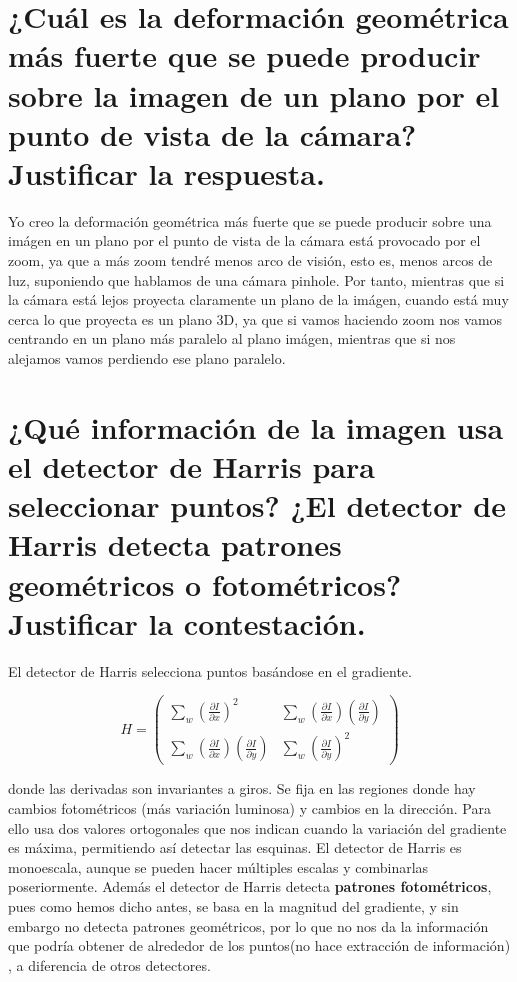 \section{¿Cuál es la deformación geométrica más fuerte que se puede producir sobre
la imagen de un plano por el punto de vista de la cámara? Justificar la respuesta.}
Yo creo la deformación geométrica más fuerte que se puede producir sobre una imágen en un plano
por el punto de vista de la cámara está provocado por el zoom, ya que a más zoom tendré
menos arco de visión, esto es, menos arcos de luz, suponiendo que hablamos de una cámara pinhole.\newline
Por tanto, mientras que si la cámara está lejos proyecta claramente un plano de la imágen,
cuando está muy cerca lo que proyecta es un plano 3D, ya que si vamos haciendo zoom nos vamos centrando
en un plano más paralelo al plano imágen, mientras que si nos alejamos vamos perdiendo ese plano paralelo.
\section{¿Qué información de la imagen usa el detector de Harris para seleccionar
puntos? ¿El detector de Harris detecta patrones geométricos o fotométricos?
Justificar la contestación.}
El detector de Harris selecciona puntos basándose en el gradiente.

\[H=\begin{pmatrix} \sum_{w}(\frac{\partial I}{\partial x})^{2} & \sum_{w}(\frac{\partial I}{\partial x})(\frac{\partial I}{\partial y}) \\ \sum_{w}(\frac{\partial I}{\partial x})(\frac{\partial I}{\partial y})& \sum_{w}(\frac{\partial I}{\partial y})^{2} \end{pmatrix}\]

donde las derivadas son invariantes a giros.
Se fija en las regiones donde
hay cambios fotométricos (más variación luminosa) y cambios en la dirección. Para ello
usa dos valores ortogonales que nos indican cuando la variación del gradiente es máxima, permitiendo así detectar las esquinas.
\newline
El detector de Harris es monoescala, aunque se pueden hacer múltiples escalas y combinarlas poseriormente. \newline Además
el detector de Harris detecta \textbf{patrones fotométricos}, pues como hemos dicho antes, se basa en la magnitud del gradiente, y sin
embargo no detecta patrones geométricos, por lo que no nos da la información que podría obtener de alrededor de los puntos(no hace extracción de información)
, a diferencia
de otros detectores.


